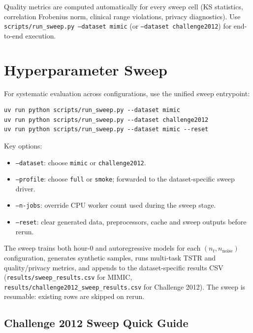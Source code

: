 Quality metrics are computed automatically for every sweep cell (KS statistics, correlation Frobenius norm, clinical range violations, privacy diagnostics). Use \texttt{scripts/run\_sweep.py --dataset mimic} (or \texttt{--dataset challenge2012}) for end-to-end execution.

\section{Hyperparameter Sweep}

For systematic evaluation across configurations, use the unified sweep entrypoint:

\begin{verbatim}
uv run python scripts/run_sweep.py --dataset mimic
uv run python scripts/run_sweep.py --dataset challenge2012
uv run python scripts/run_sweep.py --dataset mimic --reset
\end{verbatim}

Key options:
\begin{itemize}\tightlist
    \item \texttt{--dataset}: choose \texttt{mimic} or \texttt{challenge2012}.
    \item \texttt{--profile}: choose \texttt{full} or \texttt{smoke}; forwarded to the dataset-specific sweep driver.
    \item \texttt{--n-jobs}: override CPU worker count used during the sweep stage.
    \item \texttt{--reset}: clear generated data, preprocessors, cache and sweep outputs before rerun.
\end{itemize}

The sweep trains both hour-0 and autoregressive models for each
$(n_t, n_{\text{noise}})$ configuration, generates synthetic samples, runs
multi-task TSTR and quality/privacy metrics, and appends to the dataset-specific
results CSV (\texttt{results/sweep\_results.csv} for MIMIC,
\texttt{results/challenge2012\_sweep\_results.csv} for Challenge 2012). The
sweep is resumable: existing rows are skipped on rerun.

\subsection{Challenge 2012 Sweep Quick Guide}
\label{sec:challenge2012-sweep-quick-guide}

